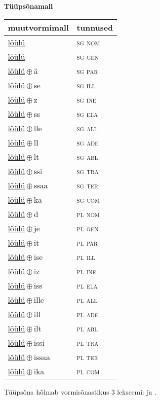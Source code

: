

\vspace{3.5em}
\noindent \begin{minipage}{\textwidth}
\noindent \textbf{Tüüpsõnamall \,}\\

\begin{sideways}
\begin{tabular}{l l}
muutvormimall & tunnused \\
\hline
\underline{löülü} & \textsc{ sg nom } \\
\underline{löülü} & \textsc{ sg gen } \\
\underline{löülü}\,$\oplus$\,ä & \textsc{ sg par } \\
\underline{löülü}\,$\oplus$\,se & \textsc{ sg ill } \\
\underline{löülü}\,$\oplus$\,z & \textsc{ sg ine } \\
\underline{löülü}\,$\oplus$\,ss & \textsc{ sg ela } \\
\underline{löülü}\,$\oplus$\,lle & \textsc{ sg all } \\
\underline{löülü}\,$\oplus$\,ll & \textsc{ sg ade } \\
\underline{löülü}\,$\oplus$\,lt & \textsc{ sg abl } \\
\underline{löülü}\,$\oplus$\,ssi & \textsc{ sg tra } \\
\underline{löülü}\,$\oplus$\,ssaa & \textsc{ sg ter } \\
\underline{löülü}\,$\oplus$\,ka & \textsc{ sg com } \\
\underline{löülü}\,$\oplus$\,d & \textsc{ pl nom } \\
\underline{löülü}\,$\oplus$\,je & \textsc{ pl gen } \\
\underline{löülü}\,$\oplus$\,it & \textsc{ pl par } \\
\underline{löülü}\,$\oplus$\,ise & \textsc{ pl ill } \\
\underline{löülü}\,$\oplus$\,iz & \textsc{ pl ine } \\
\underline{löülü}\,$\oplus$\,iss & \textsc{ pl ela } \\
\underline{löülü}\,$\oplus$\,ille & \textsc{ pl all } \\
\underline{löülü}\,$\oplus$\,ill & \textsc{ pl ade } \\
\underline{löülü}\,$\oplus$\,ilt & \textsc{ pl abl } \\
\underline{löülü}\,$\oplus$\,issi & \textsc{ pl tra } \\
\underline{löülü}\,$\oplus$\,issaa & \textsc{ pl ter } \\
\underline{löülü}\,$\oplus$\,ika & \textsc{ pl com } \\
\end{tabular}
\end{sideways}
\label{tab:tüüpsõnamall-löülü}

\end{minipage}

 
\vspace{1em}
\noindent Tüüpsõna hõlmab vormisõnastikus 3 lekseemi:  ja .
